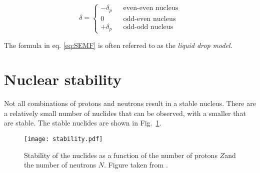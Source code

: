 \documentclass[12pt]{article}
\begin{document}
\begin{description}
\[\delta=\left\{\begin{array}{ccc}
-\delta_p& &\mbox{even-even nucleus}\\
0& &\mbox{odd-even nucleus}\\
+\delta_p& &\mbox{odd-odd nucleus}
\end{array}\right.\]
\end{description}

The formula in eq. \ref{eq:SEMF} is often referred to as the \emph{liquid drop model}. 
\section{Nuclear stability} 
Not all combinations of protons and neutrons result in a stable nucleus. There are a relatively small number of nuclides that can be observed, with a smaller that are stable. The stable nuclides are shown in Fig.~\ref{fig:stability}. 
\begin{figure}
\begin{center}
 \texttt{[image: stability.pdf]}
\end{center}
 \caption{Stability of the nuclides as a function of the number of protons $Z$and the number of neutrons $N$. Figure taken from \cite{nndc}.}\label{fig:stability}
\end{figure}
\end{document}
